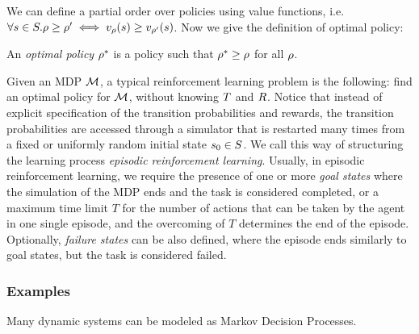 We can define a partial order over policies using value functions, i.e. $\forall s\in S. \rho \ge \rho' \iff v_\rho(s) \ge v_{\rho'}(s)$. 
Now we give the definition of optimal policy:
\begin{definition}\label{def:optimal-policy}
	An \emph{optimal policy} $\rho^*$ is a policy such that $\rho^* \ge \rho$ for all $\rho$. 
\end{definition}

Given an MDP $\mathcal{M}$, a typical reinforcement learning problem is the following: find an optimal policy for $\mathcal{M}$, without knowing $T$ and $R$. Notice that instead of explicit specification of the transition probabilities and rewards, the transition probabilities are accessed through a simulator that is restarted many times from a fixed or uniformly random initial state $s_0\in S$. We call this way of structuring the learning process \emph{episodic reinforcement learning}. Usually, in episodic reinforcement learning, we require the presence of one or more \emph{goal states} where the simulation of the MDP ends and the task is considered completed, or a maximum time limit $T$ for the number of actions that can be taken by the agent in one single episode, and the overcoming of $T$ determines the end of the episode. Optionally, \emph{failure states} can be also defined, where the episode ends similarly to goal states, but the task is considered failed.

\subsubsection{Examples}
Many dynamic systems can be modeled as Markov Decision Processes. 

